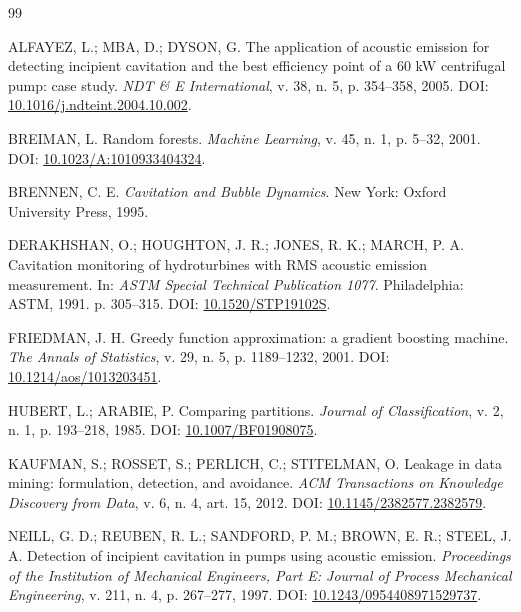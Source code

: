 \documentclass[12pt]{article}
\begin{document}
\begin{thebibliography}{99}

	ALFAYEZ, L.; MBA, D.; DYSON, G.
	\newblock The application of acoustic emission for detecting incipient cavitation and the best efficiency point of a 60 kW centrifugal pump: case study.
	\newblock \emph{NDT \& E International}, v. 38, n. 5, p. 354--358, 2005.
	\newblock DOI: \href{https://doi.org/10.1016/j.ndteint.2004.10.002}{10.1016/j.ndteint.2004.10.002}.

	BREIMAN, L.
	\newblock Random forests.
	\newblock \emph{Machine Learning}, v. 45, n. 1, p. 5--32, 2001.
	\newblock DOI: \href{https://doi.org/10.1023/A:1010933404324}{10.1023/A:1010933404324}.

	BRENNEN, C. E.
	\newblock \emph{Cavitation and Bubble Dynamics}.
	\newblock New York: Oxford University Press, 1995.

	DERAKHSHAN, O.; HOUGHTON, J. R.; JONES, R. K.; MARCH, P. A.
	\newblock Cavitation monitoring of hydroturbines with RMS acoustic emission measurement.
	\newblock In: \emph{ASTM Special Technical Publication 1077}.
	\newblock Philadelphia: ASTM, 1991. p. 305--315.
	\newblock DOI: \href{https://doi.org/10.1520/STP19102S}{10.1520/STP19102S}.

	FRIEDMAN, J. H.
	\newblock Greedy function approximation: a gradient boosting machine.
	\newblock \emph{The Annals of Statistics}, v. 29, n. 5, p. 1189--1232, 2001.
	\newblock DOI: \href{https://doi.org/10.1214/aos/1013203451}{10.1214/aos/1013203451}.

	HUBERT, L.; ARABIE, P.
	\newblock Comparing partitions.
	\newblock \emph{Journal of Classification}, v. 2, n. 1, p. 193--218, 1985.
	\newblock DOI: \href{https://doi.org/10.1007/BF01908075}{10.1007/BF01908075}.

	KAUFMAN, S.; ROSSET, S.; PERLICH, C.; STITELMAN, O.
	\newblock Leakage in data mining: formulation, detection, and avoidance.
	\newblock \emph{ACM Transactions on Knowledge Discovery from Data}, v. 6, n. 4, art. 15, 2012.
	\newblock DOI: \href{https://doi.org/10.1145/2382577.2382579}{10.1145/2382577.2382579}.

	NEILL, G. D.; REUBEN, R. L.; SANDFORD, P. M.; BROWN, E. R.; STEEL, J. A.
	\newblock Detection of incipient cavitation in pumps using acoustic emission.
	\newblock \emph{Proceedings of the Institution of Mechanical Engineers, Part E: Journal of Process Mechanical Engineering}, v. 211, n. 4, p. 267--277, 1997.
	\newblock DOI: \href{https://doi.org/10.1243/0954408971529737}{10.1243/0954408971529737}.


\end{thebibliography}
\end{document}
